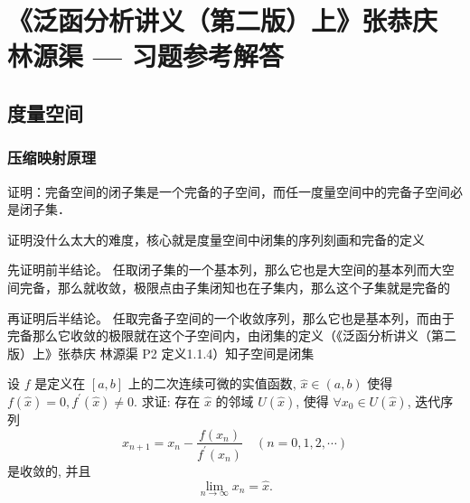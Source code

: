 \chapter{《泛函分析讲义（第二版）上》张恭庆 林源渠 --- 习题参考解答}


\section{度量空间}


\subsection{压缩映射原理}

\begin{exercise}
  证明：完备空间的闭子集是一个完备的子空间，而任一度量空间中的完备子空间必是闭子集．
\end{exercise}

\begin{answer}
  \begin{analysis}
    证明没什么太大的难度，核心就是度量空间中闭集的序列刻画和完备的定义
  \end{analysis}
  \begin{step}
    \item 先证明前半结论。
      任取闭子集的一个基本列，那么它也是大空间的基本列而大空间完备，那么就收敛，极限点由子集闭知也在子集内，那么这个子集就是完备的
    \item 再证明后半结论。
      任取完备子空间的一个收敛序列，那么它也是基本列，而由于完备那么它收敛的极限就在这个子空间内，由闭集的定义（《泛函分析讲义（第二版）上》张恭庆 林源渠 P2 定义1.1.4）知子空间是闭集
  \end{step}
\end{answer}


\begin{exercise}[title = {Newton 法}]
  设 $f$ 是定义在 $[a, b]$ 上的二次连续可微的实值函数, $\hat{x} \in(a, b)$ 使得 $f(\hat{x})=0, f^{\prime}(\hat{x}) \neq 0$. 求证: 存在 $\hat{x}$ 的邻域 $U(\hat{x})$, 使得 $\forall x_{0} \in U(\hat{x})$, 迭代序列
  \[
    x_{n+1}=x_{n}-\frac{f\left(x_{n}\right)}{f^{\prime}\left(x_{n}\right)} \quad(n=0,1,2, \cdots)
  \]
  是收敛的, 并且
  \[
    \lim _{n \rightarrow \infty} x_{n}=\hat{x}.
  \]
\end{exercise}

